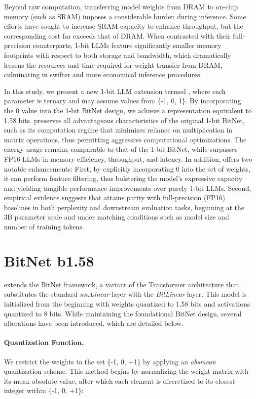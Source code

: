 Beyond raw computation, transferring model weights from DRAM to on-chip memory (such as SRAM) imposes a considerable burden during inference. Some efforts have sought to increase SRAM capacity to enhance throughput, but the corresponding cost far exceeds that of DRAM. When contrasted with their full-precision counterparts, 1-bit LLMs feature significantly smaller memory footprints with respect to both storage and bandwidth, which dramatically lessens the resources and time required for weight transfer from DRAM, culminating in swifter and more economical inference procedures.

In this study, we present a new 1-bit LLM extension termed \textbf{}, where each parameter is ternary and may assume values from \{-1, 0, 1\}. By incorporating the 0 value into the 1-bit BitNet design, we achieve a representation equivalent to 1.58 bits.  preserves all advantageous characteristics of the original 1-bit BitNet, such as its computation regime that minimizes reliance on multiplication in matrix operations, thus permitting aggressive computational optimizations. The energy usage remains comparable to that of the 1-bit BitNet, while  surpasses FP16 LLMs in memory efficiency, throughput, and latency. In addition,  offers two notable enhancements: First, by explicitly incorporating 0 into the set of weights, it can perform feature filtering, thus bolstering the model’s expressive capacity and yielding tangible performance improvements over purely 1-bit LLMs. Second, empirical evidence suggests that  attains parity with full-precision (FP16) baselines in both perplexity and downstream evaluation tasks, beginning at the 3B parameter scale and under matching conditions such as model size and number of training tokens.

\section{BitNet b1.58}

 extends the BitNet framework, a variant of the Transformer architecture that substitutes the standard \emph{nn.Linear} layer with the \emph{BitLinear} layer. This model is initialized from the beginning with weights quantized to 1.58 bits and activations quantized to 8 bits. While maintaining the foundational BitNet design, several alterations have been introduced, which are detailed below.

\paragraph{Quantization Function.} We restrict the weights to the set \{-1, 0, +1\} by applying an \emph{absmean} quantization scheme. This method begins by normalizing the weight matrix with its mean absolute value, after which each element is discretized to its closest integer within \{-1, 0, +1\}:

